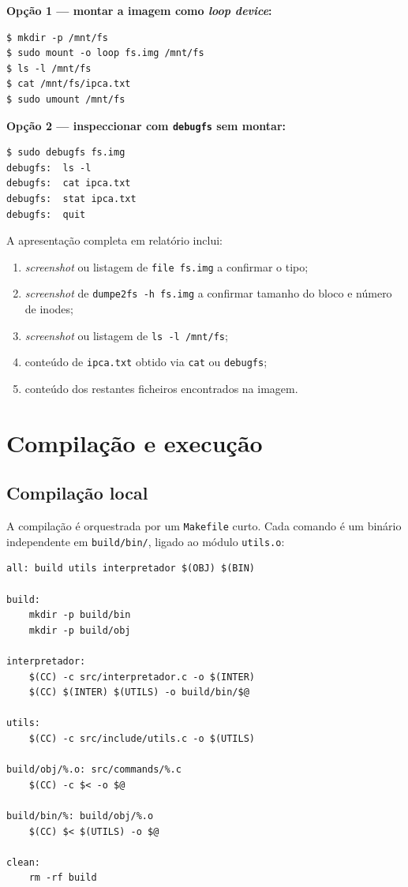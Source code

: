 \documentclass[11pt,a4paper]{article}
\begin{document}
\textbf{Opção 1 --- montar a imagem como \textit{loop device}:}

\begin{lstlisting}[style=shellstyle]
$ mkdir -p /mnt/fs
$ sudo mount -o loop fs.img /mnt/fs
$ ls -l /mnt/fs
$ cat /mnt/fs/ipca.txt
$ sudo umount /mnt/fs
\end{lstlisting}

\textbf{Opção 2 --- inspeccionar com \texttt{debugfs} sem montar:}

\begin{lstlisting}[style=shellstyle]
$ sudo debugfs fs.img
debugfs:  ls -l
debugfs:  cat ipca.txt
debugfs:  stat ipca.txt
debugfs:  quit
\end{lstlisting}

A apresentação completa em relatório inclui:

\begin{enumerate}[leftmargin=2em]
    \item \textit{screenshot} ou listagem de \texttt{file fs.img} a confirmar o tipo;
    \item \textit{screenshot} de \texttt{dumpe2fs -h fs.img} a confirmar tamanho do bloco e número de inodes;
    \item \textit{screenshot} ou listagem de \texttt{ls -l /mnt/fs};
    \item conteúdo de \texttt{ipca.txt} obtido via \texttt{cat} ou \texttt{debugfs};
    \item conteúdo dos restantes ficheiros encontrados na imagem.
\end{enumerate}

\section{Compilação e execução}

\subsection{Compilação local}

A compilação é orquestrada por um \texttt{Makefile} curto. Cada comando é um binário independente em \texttt{build/bin/}, ligado ao módulo \texttt{utils.o}:

\begin{lstlisting}[style=shellstyle,caption={Excerto do \texttt{Makefile}}]
all: build utils interpretador $(OBJ) $(BIN)

build:
    mkdir -p build/bin
    mkdir -p build/obj

interpretador:
    $(CC) -c src/interpretador.c -o $(INTER)
    $(CC) $(INTER) $(UTILS) -o build/bin/$@

utils:
    $(CC) -c src/include/utils.c -o $(UTILS)

build/obj/%.o: src/commands/%.c
    $(CC) -c $< -o $@

build/bin/%: build/obj/%.o
    $(CC) $< $(UTILS) -o $@

clean:
    rm -rf build
\end{lstlisting}
\end{document}
